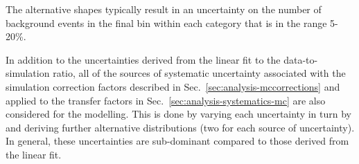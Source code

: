 The alternative \mht shapes typically result in an uncertainty on the number of 
background events in the final \mht bin within each \njnbht category that is in 
the range 5-20\%.

In addition to the uncertainties derived from the linear fit to the 
data-to-simulation ratio, all of the sources of systematic uncertainty 
associated with the simulation correction factors described in 
Sec.~\ref{sec:analysis-mccorrections} and applied to the transfer factors in 
Sec.~\ref{sec:analysis-systematics-mc} are also considered for the \mht 
modelling. This is done by varying each uncertainty in turn by \pmonesigma 
and deriving further alternative \mht distributions (two for each source of 
uncertainty). In general, these uncertainties are sub-dominant compared to 
those derived from the linear fit.

